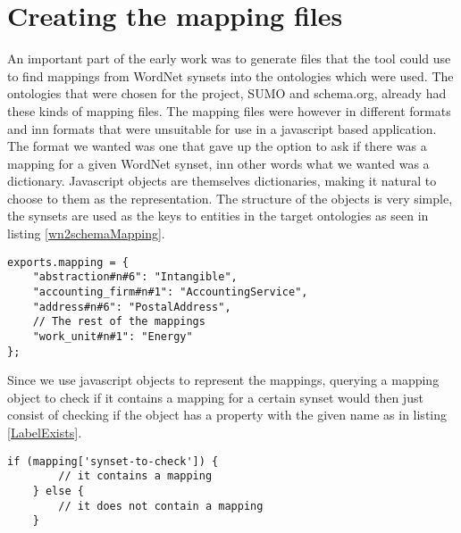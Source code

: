 \section{Creating the mapping files}
An important part of the early work was to generate files that the tool could use to find mappings from WordNet synsets
into the ontologies which were used.
The ontologies that were chosen for the project, SUMO  and schema.org, already had these kinds of mapping files.
The mapping files were however in different formats and inn formats that were unsuitable for use in a javascript based application.
The format we wanted was one that gave up the option to ask if there was a mapping for a given WordNet synset,
inn other words what we wanted was a dictionary.
Javascript objects are themselves dictionaries, making it natural to choose to them as the representation.
The structure of the objects is very simple,
the synsets are used as the keys to entities in the target ontologies as seen in listing \ref{wn2schemaMapping}.

\begin{lstlisting}[label=wn2schemaMapping, caption={Excerpt from the \href{https://github.com/EivindEE/Madame/blob/master/mappings/wn2schema.js}{wn2schema.js} mapping file}]
exports.mapping = {
	"abstraction#n#6": "Intangible",
	"accounting_firm#n#1": "AccountingService",
	"address#n#6": "PostalAddress",
	// The rest of the mappings
	"work_unit#n#1": "Energy"
};
\end{lstlisting}

Since we use javascript objects to represent the mappings,
querying a mapping object to check if it contains a mapping for a certain synset would then just consist of checking if
the object has a property with the given name as in listing \ref{LabelExists}.
\begin{lstlisting}[label=LabelExists,caption=Testing if a mapping exists]
    if (mapping['synset-to-check']) {
        // it contains a mapping
    } else {
        // it does not contain a mapping
    }
\end{lstlisting}

